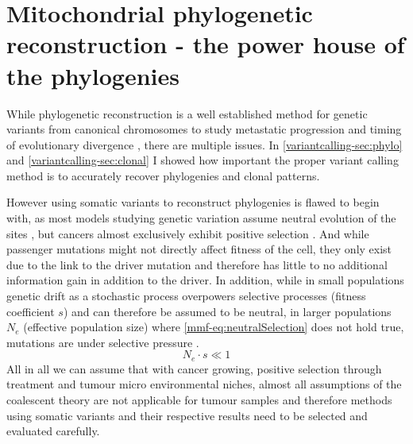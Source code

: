 \section[Mitochondrial phylogenetic reconstruction]{Mitochondrial phylogenetic reconstruction - the power house of the phylogenies}
\label{cascade-sec:mitochondria}

While phylogenetic reconstruction is a well established method for genetic variants from canonical chromosomes to study metastatic progression and timing of evolutionary divergence \cite{Deshwar2015,Brown2017,Hu2019}, there are multiple issues. In \autoref{variantcalling-sec:phylo} and \autoref{variantcalling-sec:clonal} I showed how important the proper variant calling method is to accurately recover phylogenies and clonal patterns. 

However using somatic variants to reconstruct phylogenies is flawed to begin with, as most models studying genetic variation assume neutral evolution of the sites \cite{Kimura1968,Lynch1989}, but cancers almost exclusively exhibit positive selection \cite{Cannataro2018}. And while passenger mutations might not directly affect fitness of the cell, they only exist due to the link to the driver mutation and therefore has little to no additional information gain in addition to the driver. In addition, while in small populations genetic drift as a stochastic process overpowers selective processes (fitness coefficient $s$) and can therefore be assumed to be neutral, in larger populations $N_e$ (effective population size) where \autoref{mmf-eq:neutralSelection} does not hold true, mutations are under selective pressure \cite{EyreWalker2007}.
\begin{equation}
N_e \cdot s \ll 1 \label{mmf-eq:neutralSelection}
\end{equation}
\myequation[\ref{mmf-eq:neutralSelection}]{Selective pressure with effective population size}
\vspace{-3em}
All in all we can assume that with cancer growing, positive selection through treatment and tumour micro environmental niches, almost all assumptions of the coalescent theory are not applicable for tumour samples and therefore methods using somatic variants and their respective results need to be selected and evaluated carefully.

